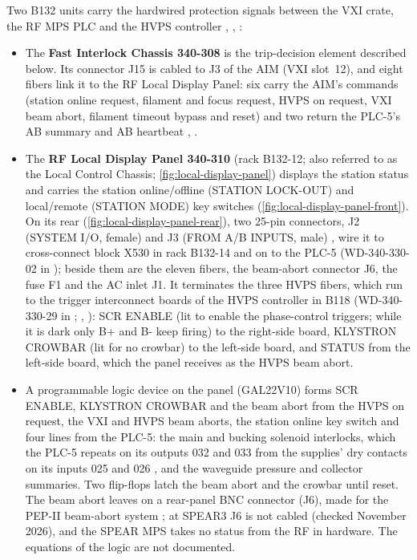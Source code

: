 Two B132 units carry the hardwired protection signals between the VXI crate, the RF MPS PLC and the HVPS controller , , :

\begin{itemize}
\tightlist
\item
  The \textbf{Fast Interlock Chassis 340-308} is the trip-decision element described below. Its connector J15 is cabled to J3 of the AIM (VXI slot~12), and eight fibers link it to the RF Local Display Panel: six carry the AIM's commands (station online request, filament and focus request, HVPS on request, VXI beam abort, filament timeout bypass and reset) and two return the PLC-5's AB summary and AB heartbeat , .
\item
  The \textbf{RF Local Display Panel 340-310} (rack B132-12; also referred to as the Local Control Chassis; \cref{fig:local-display-panel}) displays the station status and carries the station online/offline (STATION LOCK-OUT) and local/remote (STATION MODE) key switches (\cref{fig:local-display-panel-front}). On its rear (\cref{fig:local-display-panel-rear}), two 25-pin connectors, J2 (SYSTEM I/O, female) and J3 (FROM A/B INPUTS, male) , wire it to cross-connect block X530 in rack B132-14 and on to the PLC-5 (WD-340-330-02 in ); beside them are the eleven fibers, the beam-abort connector J6, the fuse F1 and the AC inlet J1. It terminates the three HVPS fibers, which run to the trigger interconnect boards of the HVPS controller in B118 (WD-340-330-29 in ; , ): SCR ENABLE (lit to enable the phase-control triggers; while it is dark only B+ and B- keep firing) to the right-side board, KLYSTRON CROWBAR (lit for no crowbar) to the left-side board, and STATUS from the left-side board, which the panel receives as the HVPS beam abort.
\item
  A programmable logic device on the panel (GAL22V10) forms SCR ENABLE, KLYSTRON CROWBAR and the beam abort from the HVPS on request, the VXI and HVPS beam aborts, the station online key switch and four lines from the PLC-5: the main and bucking solenoid interlocks, which the PLC-5 repeats on its outputs 032 and 033 from the supplies' dry contacts on its inputs 025 and 026 , and the waveguide pressure and collector summaries. Two flip-flops latch the beam abort and the crowbar until reset. The beam abort leaves on a rear-panel BNC connector (J6), made for the PEP-II beam-abort system ; at SPEAR3 J6 is not cabled (checked November 2026), and the SPEAR MPS takes no status from the RF in hardware. The equations of the logic are not documented.
\end{itemize}

